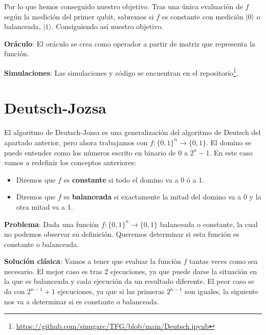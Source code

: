 Por lo que hemos conseguido nuestro objetivo. Tras una única evaluación de $f$ según la medición del primer qubit, sabremos si $f$ es constante con medición $|0\rangle$ o balanceada, $|1\rangle$. Consiguiendo así nuestro objetivo.

\vspace{5pt}

\textbf{Oráculo}: El oráculo se crea como operador a partir de matriz que representa la función.

\vspace{5pt}

\textbf{Simulaciones}: Las simulaciones y código se encuentran en el repositorio\footnote{\url{https://github.com/sinugarc/TFG/blob/main/Deutsch.ipynb}}.

\section{Deutsch-Jozsa}
\label{Sec3.3:Deutsch-Jozsa}
 El algoritmo de Deutsch-Jozsa\cite{B:QuantumScientist:2008} es una generalización del algoritmo de Deutsch del apartado anterior, pero ahora trabajamos con $f:\{0,1\}^{n} \rightarrow\{0,1\}$. El domino se puede entender como los números escrito en binario de 0 a $2^{n}-1$. En este caso vamos a redefinir los conceptos anteriores:

 \begin{itemize}
     \item Diremos que $f$ es \textbf{constante} si todo el domino va a 0 ó a 1.
     \item Diremos que $f$ es \textbf{balanceada} si exactamente la mitad del domino va a 0 y la otra mitad va a 1.
 \end{itemize}

 \textbf{Problema}\label{P:DJ}: Dada una función $f:\{0,1\}^{n} \rightarrow\{0,1\}$ balanceada o constante, la cual no podemos observar su definición. Queremos determinar si esta función es constante o balanceada.

 \vspace{10pt}

 \textbf{Solución clásica}: Vamos a tener que evaluar la función $f$ tantas veces como sea necesario. El mejor caso es tras 2 ejecuciones, ya que puede darse la situación en la que es balanceada y cada ejecución da un resultado diferente. El peor caso se da con $2^{n-1}+1$ ejecuciones, ya que si las primeras $2^{n-1}$ son iguales, la siguiente nos va a determinar si es constante o balanceada.  \newline

